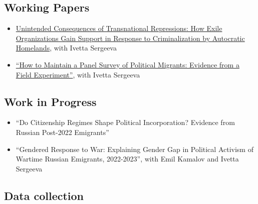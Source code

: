 \documentclass[
]{article}
\providecommand{\tightlist}{%
  \setlength{\itemsep}{0pt}\setlength{\parskip}{0pt}}
\begin{document}
\hypertarget{working-papers}{%
\subsection{Working Papers}\label{working-papers}}

\begin{itemize}
\tightlist
\item
  \href{https://osf.io/preprints/socarxiv/wks2m}{Unintended Consequences
  of Transnational Repressions: How Exile Organizations Gain Support in
  Response to Criminalization by Autocratic Homelands}, with Ivetta
  Sergeeva
\item
  \href{https://drive.google.com/file/d/1bduV7Dvptf2XpnNHymXRVa6tCsDntgZD/view?usp=sharing}{``How
  to Maintain a Panel Survey of Political Migrants: Evidence from a
  Field Experiment''}, with Ivetta Sergeeva
\end{itemize}

\hypertarget{work-in-progress}{%
\subsection{Work in Progress}\label{work-in-progress}}

\begin{itemize}
\item
  ``Do Citizenship Regimes Shape Political Incorporation? Evidence from
  Russian Post-2022 Emigrants''
\item
  ``Gendered Response to War: Explaining Gender Gap in Political
  Activism of Wartime Russian Emigrants, 2022-2023'', with Emil Kamalov
  and Ivetta Sergeeva
\end{itemize}

\hypertarget{data-collection}{%
\subsection{Data collection}\label{data-collection}}
\end{document}
